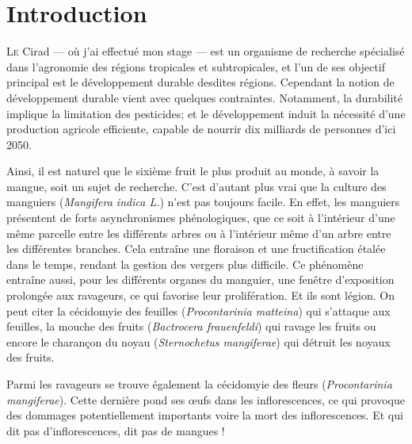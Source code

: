 \chapter{Introduction}

\lettrine{L}{e} Cirad --- où j'ai effectué mon stage --- est un organisme de recherche spécialisé dans l'agronomie des régions tropicales et subtropicales, et l'un de ses objectif principal est le développement durable desdites régions.
Cependant la notion de développement durable vient avec quelques contraintes.
Notamment, la durabilité implique la limitation des pesticides; et le développement induit la nécessité d'une production agricole efficiente, capable de nourrir dix milliards de personnes d'ici 2050.

Ainsi, il est naturel que le sixième fruit le plus produit au monde, à savoir la mangue, soit un sujet de recherche.
C'est d'autant plus vrai que la culture des manguiers (\emph{Mangifera indica L.}) n'est pas toujours facile.
En effet, les manguiers présentent de forts asynchronismes phénologiques, que ce soit à l'intérieur d'une même parcelle entre les différents arbres ou à l'intérieur même d'un arbre entre les différentes branches.
Cela entraîne une floraison et une fructification étalée dans le temps, rendant la gestion des vergers plus difficile.
Ce phénomène entraîne aussi, pour les différents organes du manguier, une fenêtre d'exposition prolongée aux ravageurs, ce qui favorise leur prolifération.
Et ils sont légion. On peut citer la cécidomyie des feuilles (\emph{Procontarinia matteina}) qui s'attaque aux feuilles, la mouche des fruits (\emph{Bactrocera frauenfeldi}) qui ravage les fruits ou encore le charançon du noyau (\emph{Sternochetus mangiferae}) qui détruit les noyaux des fruits.

Parmi les ravageurs se trouve également la cécidomyie des fleurs (\emph{Procontarinia mangiferae}). Cette dernière pond ses œufs dans les inflorescences, ce qui provoque des dommages potentiellement importants voire la mort des inflorescences. Et qui dit pas d'inflorescences, dit pas de mangues !


